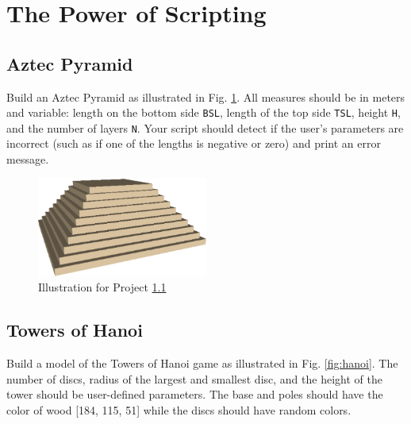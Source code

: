 


\section{The Power of Scripting}

\subsection{Aztec Pyramid} \label{6.1}
Build an Aztec Pyramid as illustrated in Fig. \ref{fig:aztec}. All measures should be 
in meters and variable: length 
on the bottom side {{\tt BSL}}, length of the top side {\tt TSL}, 
height {\tt H}, and the number of layers {\tt N}. Your script should 
detect if the user's parameters are incorrect (such as if one of the lengths is negative or 
zero) and print an error message.


\begin{figure}[!ht]
\begin{center}
\includegraphics[width=0.5\textwidth]{img/aztec.png}
\end{center}
\vspace{-2mm}
\caption{Illustration for Project \ref{6.1}}
\label{fig:aztec}
\end{figure}
\noindent



\subsection{Towers of Hanoi} \label{6.2}
Build a model of the Towers of Hanoi game as illustrated in Fig. \ref{fig:hanoi}. 
The number of discs, radius of the largest and smallest disc, and the height of the tower 
should be user-defined parameters. The base and poles should have the color of wood
[184, 115, 51] while the discs should have random colors.


